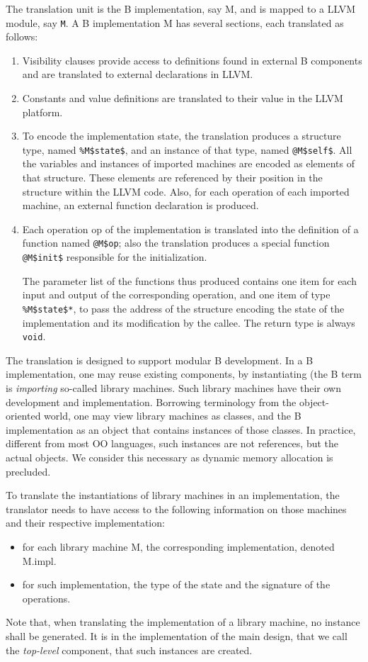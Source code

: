 \documentclass{llncs}
\newcommand{\llvm}[1]{\texttt{#1}}
\newcommand{\B}[1]{\textsf{#1}}
\begin{document}
The translation unit is the B implementation, say \B{M}, and is mapped to a LLVM
module, say \llvm{M}. A B implementation \B{M} has several sections, each
translated as follows:
\begin{enumerate}
\item Visibility clauses provide access to definitions found in external
  B components and are translated to external declarations in LLVM.
\item Constants and value definitions are translated to their value in the
  LLVM platform.
\item To encode the implementation state, the translation produces a structure
  type, named \llvm{\%M\$state\$}, and an instance of that type, named
  \llvm{@M\$self\$}. All the variables and instances of imported machines are
  encoded as elements of that structure. These elements are referenced by their
  position in the structure within the LLVM code. Also, for each operation of
  each imported machine, an external function declaration is produced.
\item Each operation \B{op} of the implementation is translated into the
  definition of a function named \llvm{@M\$op}; also the translation produces a
  special function \llvm{@M\$init\$} responsible for the initialization.

  The parameter list of the functions thus produced contains one item for each
  input and output of the corresponding operation, and one item of type
  \llvm{\%M\$state\$*}, to pass the address of the structure encoding the
  state of the implementation and its modification by the callee. The return
  type is always \llvm{void}.
\end{enumerate}
The translation is designed to support modular B development. In a B
implementation, one may reuse existing components, by instantiating (the B term
is \emph{importing} so-called library machines. Such library machines have their
own development and implementation. Borrowing terminology from the
object-oriented world, one may view library machines as classes, and the B
implementation as an object that contains instances of those classes. In
practice, different from most OO languages, such instances are not references,
but the actual objects. We consider this necessary as dynamic memory allocation
is precluded.

To translate the instantiations of library machines in an implementation, the
translator needs to have access to the following information on those machines
and their respective implementation:
\begin{itemize}
\item for each library machine \B{M}, the corresponding implementation, denoted
  \B{M.impl}.
\item for such implementation, the type of the state and the signature of the
  operations.
\end{itemize}
Note that, when translating the implementation of a library machine, no instance
shall be generated. It is in the implementation of the main design, that we call
the \emph{top-level} component, that such instances are created.
\end{document}
